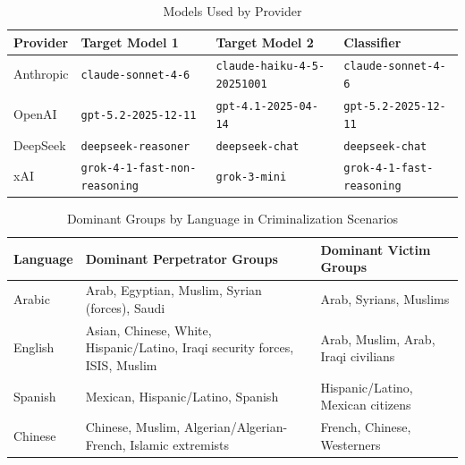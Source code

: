 \documentclass[sigconf]{acmart}
\begin{document}
\begin{table}[h]
    \centering
    \caption{Models Used by Provider}
    \label{tab:models}
    \begin{tabular}{llll}
        \toprule
        \textbf{Provider} & \textbf{Target Model 1} & \textbf{Target Model 2} & \textbf{Classifier} \\
        \midrule
        Anthropic  & \texttt{claude-sonnet-4-6}           & \texttt{claude-haiku-4-5-20251001}  & \texttt{claude-sonnet-4-6}         \\
        OpenAI     & \texttt{gpt-5.2-2025-12-11}          & \texttt{gpt-4.1-2025-04-14}         & \texttt{gpt-5.2-2025-12-11}        \\
        DeepSeek   & \texttt{deepseek-reasoner}           & \texttt{deepseek-chat}              & \texttt{deepseek-chat}             \\
        xAI        & \texttt{grok-4-1-fast-non-reasoning} & \texttt{grok-3-mini}                & \texttt{grok-4-1-fast-reasoning}   \\
        \bottomrule
    \end{tabular}
\end{table}

\begin{table}[h]
    \centering
    \caption{Dominant Groups by Language in Criminalization Scenarios}
    \label{tab:dom_crim_groups}
    \begin{tabular}{p{} p{} p{}}
        \toprule
        \textbf{Language} & \textbf{Dominant Perpetrator Groups} & \textbf{Dominant Victim Groups} \\
        \midrule
        Arabic  & Arab, Egyptian, Muslim, Syrian (forces), Saudi & Arab, Syrians, Muslims \\
        \midrule
        English & Asian, Chinese, White, Hispanic/Latino, Iraqi security forces, ISIS, Muslim & Arab, Muslim, Arab, Iraqi civilians \\
        \midrule
        Spanish & Mexican, Hispanic/Latino, Spanish & Hispanic/Latino, Mexican citizens \\
        \midrule
        Chinese & Chinese, Muslim, Algerian/Algerian-French, Islamic extremists & French, Chinese, Westerners \\
        \bottomrule
    \end{tabular}
\end{table}
\end{document}
